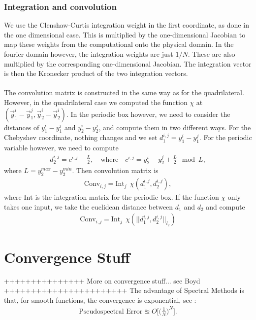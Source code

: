 \documentclass[11pt, a4paper]{article}
\theoremstyle{definition}
\begin{document}
\subsubsection{Integration and convolution}
We use the Clenshaw-Curtis integration weight in the first coordinate, as done in the one dimensional case. This is multiplied by the one-dimensional Jacobian to map these weights from the computational onto the physical domain. In the fourier domain however, the integration weights are just $1/N$. These are also multiplied by the corresponding one-dimensional Jacobian. The integration vector is then the Kronecker product of the two integration vectors.
\\
\\
The convolution matrix is constructed in the same way as for the quadrilateral. However, in the quadrilateral case we computed the function $\chi$ at $\left(\vec {y}_1^{i} - \vec {y}_1^{j}, \vec{y}_2^{i} - \vec {y}_2^{i} \right)$. In the periodic box however, we need to consider the distances of ${y}_1^{i} - {y}_1^{j}$ and ${y}_2^{i} - {y}_2^{j}$, and compute them in two different ways. 
For the Chebyshev coordinate, nothing changes and we set $d_1^{i,j} = {y}_1^{i} - {y}_1^{j}$. For the periodic variable however, we need to compute 
\begin{align*}	
	d_2^{i,j} = c^{i,j} - \frac{L}{2}, \quad \text{where} \quad c^{i,j} =  {y}_2^{i} - {y}_2^{j} + \frac{L}{2} \mod L,
\end{align*}
where $L = y_2^{max} - y_2^{min}$. 
Then convolution matrix is
\begin{align*}
	\text{Conv}_{i,j} = \text{Int}_j \ \ \chi(d_1^{i,j}, d_2^{i,j}),
\end{align*}
where $\text{Int}$ is the integration matrix for the periodic box.
If the function $\chi$ only takes one input, we take the euclidean distance between $d_1$ and $d_2$ and compute
\begin{align*}
	\text{Conv}_{i,j} = \text{Int}_j \ \ \chi(||d_1^{i,j}, d_2^{i,j}||_{l_2})
\end{align*}


\section{Convergence Stuff}
+++++++++++++++ More on convergence stuff... see Boyd +++++++++++++++++++++++
The advantage of Spectral Methods is that, for smooth functions, the convergence is exponential, see \cite{Boyd1}:
\begin{align*}
	\text{Pseudospectral Error} \approxeq O \bigg[ \bigg( \frac{1}{N} \bigg)^N \bigg].
\end{align*}
\end{document}

